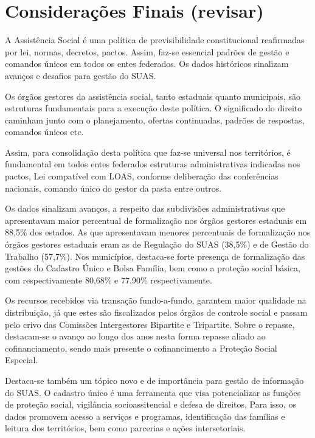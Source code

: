 \documentclass[
  brazilian]{report}
\begin{document}
\hypertarget{considerauxe7uxf5es-finais-revisar}{%
\section{Considerações Finais
(revisar)}\label{considerauxe7uxf5es-finais-revisar}}

A Assistência Social é uma política de previsibilidade constitucional
reafirmadas por lei, normas, decretos, pactos. Assim, faz-se essencial
padrões de gestão e comandos únicos em todos os entes federados. Os
dados históricos sinalizam avanços e desafios para gestão do SUAS.

Os órgãos gestores da assistência social, tanto estaduais quanto
municipais, são estruturas fundamentais para a execução deste política.
O significado do direito caminham junto com o planejamento, ofertas
continuadas, padrões de respostas, comandos únicos etc.

Assim, para consolidação desta política que faz-se universal nos
territórios, é fundamental em todos entes federados estruturas
administrativas indicadas nos pactos, Lei compatível com LOAS, conforme
deliberação das conferências nacionais, comando único do gestor da pasta
entre outros.

Os dados sinalizam avanços, a respeito das subdivisões administrativas
que apresentavam maior percentual de formalização nos órgãos gestores
estaduais em 88,5\% dos estados. As que apresentavam menores percentuais
de formalização nos órgãos gestores estaduais eram as de Regulação do
SUAS (38,5\%) e de Gestão do Trabalho (57,7\%). Nos municípios,
destaca-se forte presença de formalização das gestões do Cadastro Único
e Bolsa Família, bem como a proteção social básica, com respectivamente
80,68\% e 77,90\% respectivamente.

Os recursos recebidos via transação fundo-a-fundo, garantem maior
qualidade na distribuição, já que estes são fiscalizados pelos órgãos de
controle social e passam pelo crivo das Comissões Intergestores
Bipartite e Tripartite. Sobre o repasse, destacam-se o avanço ao longo
dos anos nesta forma repasse aliado ao cofinanciamento, sendo mais
presente o cofinancimento a Proteção Social Especial.

Destaca-se também um tópico novo e de importância para gestão de
informação do SUAS. O cadastro único é uma ferramenta que visa
potencializar as funções de proteção social, vigilância socioassitencial
e defesa de direitos, Para isso, os dados promovem acesso a serviços e
programas, identificação das famílias e leitura dos territórios, bem
como parcerias e ações intersetoriais.
\end{document}
